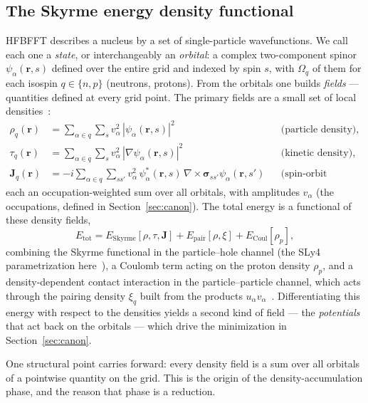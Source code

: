 \documentclass[preprint,12pt]{elsarticle}
\numberwithin{equation}{section}
\begin{document}
\subsection{The Skyrme energy density functional}\label{sec:edf}
HFBFFT describes a nucleus by a set of single-particle wavefunctions. We call each one a \emph{state}, or interchangeably an \emph{orbital}: a complex two-component spinor $\psi_\alpha(\mathbf r,s)$ defined over the entire grid and indexed by spin $s$, with $\Omega_q$ of them for each isospin $q\in\{n,p\}$ (neutrons, protons). From the orbitals one builds \emph{fields} --- quantities defined at every grid point. The primary fields are a small set of local densities~\cite{vautherin1972,bender}:
\begin{align*}
\rho_q(\mathbf r) &= \sum_{\alpha\in q}\sum_s v_\alpha^2\,|\psi_\alpha(\mathbf r,s)|^2 && \text{(particle density),}\\
\tau_q(\mathbf r) &= \sum_{\alpha\in q}\sum_s v_\alpha^2\,|\nabla\psi_\alpha(\mathbf r,s)|^2 && \text{(kinetic density),}\\
\mathbf J_q(\mathbf r) &= -i\sum_{\alpha\in q}\sum_{ss'} v_\alpha^2\,\psi_\alpha^*(\mathbf r,s)\,\nabla\times\boldsymbol\sigma_{ss'}\psi_\alpha(\mathbf r,s') && \text{(spin-orbit density),}
\end{align*}
each an occupation-weighted sum over all orbitals, with amplitudes $v_\alpha$ (the occupations, defined in Section~\ref{sec:canon}). The total energy is a functional of these density fields,
\[
E_{\mathrm{tot}} = E_{\mathrm{Skyrme}}[\rho,\tau,\mathbf J] + E_{\mathrm{pair}}[\rho,\xi] + E_{\mathrm{Coul}}[\rho_p],
\]
combining the Skyrme functional in the particle--hole channel (the SLy4 parametrization here~\cite{chabanat1998}), a Coulomb term acting on the proton density $\rho_p$, and a density-dependent contact interaction in the particle--particle channel, which acts through the pairing density $\xi_q$ built from the products $u_\alpha v_\alpha$~\cite{dobaczewski1984}. Differentiating this energy with respect to the densities yields a second kind of field --- the \emph{potentials} that act back on the orbitals --- which drive the minimization in Section~\ref{sec:canon}.

One structural point carries forward: every density field is a sum over all orbitals of a pointwise quantity on the grid. This is the origin of the density-accumulation phase, and the reason that phase is a reduction.
\end{document}
